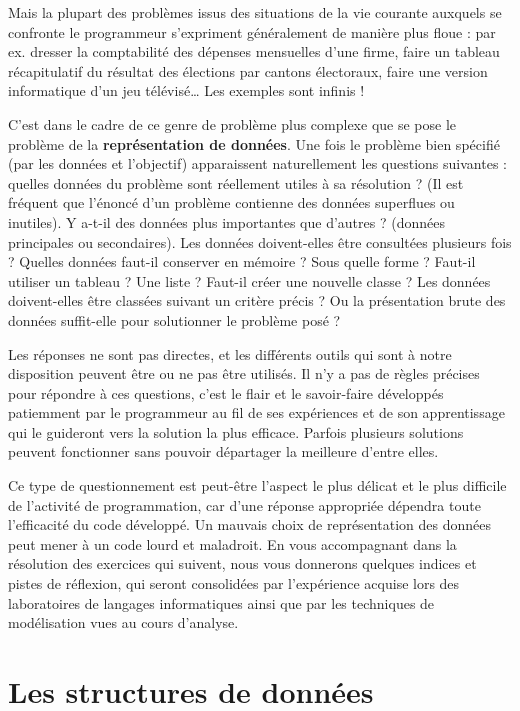 	Mais la plupart des problèmes 
	issus des situations de la vie courante 
	auxquels se confronte le programmeur 
	s’expriment généralement de manière plus floue : 
	par ex. dresser la comptabilité des dépenses mensuelles d’une firme, 
	faire un tableau récapitulatif du résultat des élections par cantons électoraux, 
	faire une version informatique d’un jeu télévisé\dots{} 
	Les exemples sont infinis !
	
	C’est dans le cadre de ce genre de problème plus complexe 
	que se pose le problème de la \textbf{représentation de données}. 
	Une fois le problème bien spécifié (par les données et l’objectif) 
	apparaissent naturellement les questions suivantes : 
	quelles données du problème sont réellement utiles à sa résolution ?
	(Il est fréquent que l’énoncé d’un problème contienne 
	des données superflues ou inutiles). 
	Y a-t-il des données plus importantes que d’autres ? 
	(données principales ou secondaires). 
	Les données doivent-elles être consultées plusieurs fois ?
	Quelles données faut-il conserver en mémoire ? Sous quelle forme ?
	Faut-il utiliser un tableau ? Une liste ? 
	Faut-il créer une nouvelle classe ? 
	Les données doivent-elles être classées suivant un critère précis ? 
	Ou la présentation brute des données suffit-elle pour
	solutionner le problème posé ?
	
	Les réponses ne sont pas directes, 
	et les différents outils qui sont à notre disposition 
	peuvent être ou ne pas être utilisés. 
	Il n’y a pas de règles précises pour répondre à ces questions, 
	c’est le flair et le savoir-faire 
	développés patiemment par le programmeur au fil de ses expériences 
	et de son apprentissage qui le guideront vers la solution la plus efficace. 
	Parfois plusieurs solutions peuvent fonctionner 
	sans pouvoir départager la meilleure d’entre elles.
	
	Ce type de questionnement est peut-être l’aspect le plus délicat 
	et le plus difficile de l’activité de programmation, 
	car d’une réponse appropriée dépendra toute l’efficacité du code développé. 
	Un mauvais choix de représentation des données 
	peut mener à un code lourd et maladroit. 
	En vous accompagnant dans la résolution des exercices qui suivent,
	nous vous donnerons quelques indices et pistes de réflexion, 
	qui seront consolidées par l’expérience acquise 
	lors des laboratoires de langages informatiques 
	ainsi que par les techniques de modélisation vues au cours d’analyse.

\section{Les structures de données}

